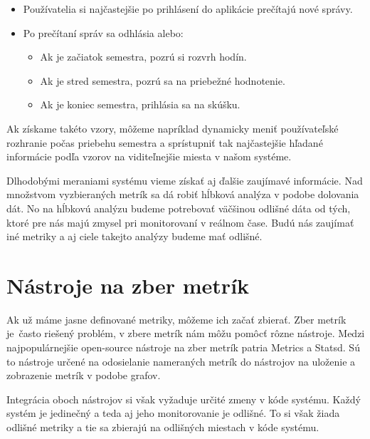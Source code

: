\documentclass[a4paper, upjsfrontpage, thesismargins, thesislinespacing]{rnthesis}
\begin{document}
\begin{itemize}
	\item Používatelia si najčastejšie po prihlásení do aplikácie prečítajú nové správy.
	\item Po prečítaní správ sa odhlásia alebo:
	\begin{itemize}
		\item Ak je začiatok semestra, pozrú si rozvrh hodín.
		\item Ak je stred semestra, pozrú sa na priebežné hodnotenie.
		\item Ak je koniec semestra, prihlásia sa na skúšku.
	\end{itemize}
\end{itemize}

Ak získame takéto vzory, môžeme napríklad dynamicky meniť používateľské rozhranie počas priebehu semestra a sprístupniť tak najčastejšie hľadané informácie podľa vzorov na viditeľnejšie miesta v našom systéme.

Dlhodobými meraniami systému vieme získať aj ďalšie zaujímavé informácie.
Nad množstvom vyzbieraných metrík sa dá robiť hĺbková analýza v podobe dolovania dát.
No na hĺbkovú analýzu budeme potrebovať väčšinou odlišné dáta od tých, ktoré pre nás majú zmysel pri monitorovaní v reálnom čase.
Budú nás zaujímať iné metriky a aj ciele takejto analýzy budeme mať odlišné.

\newpage


\chapter{Nástroje na zber metrík}

Ak už máme jasne definované metriky, môžeme ich začať zbierať.
Zber metrík je~často riešený problém, v zbere metrík nám môžu pomôcť rôzne nástroje.
Medzi naj\-populár\-nejšie open-source nástroje na zber metrík patria Metrics a Statsd.
Sú to nástroje určené na odosielanie nameraných metrík do nástrojov na uloženie a zobrazenie metrík v podobe grafov.

Integrácia oboch nástrojov si však vyžaduje určité zmeny v kóde systému.
Každý systém je jedinečný a teda aj jeho monitorovanie je odlišné.
To si však žiada odlišné metriky a tie sa zbierajú na odlišných miestach v kóde systému.
\end{document}
